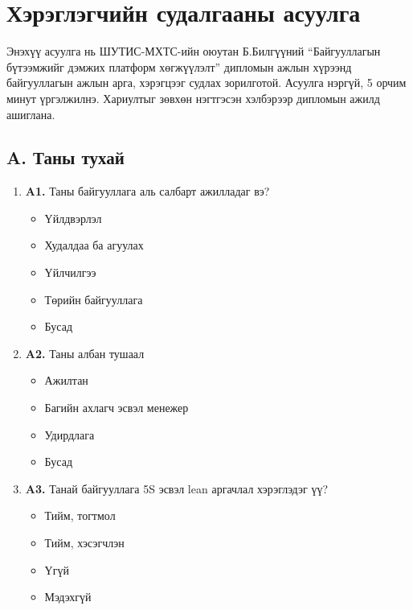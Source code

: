 
\chapter{Хэрэглэгчийн судалгааны асуулга}
\label{AppendixA}
Энэхүү асуулга нь ШУТИС-МХТС-ийн оюутан Б.Билгүүний ``Байгууллагын бүтээмжийг дэмжих платформ хөгжүүлэлт'' дипломын ажлын хүрээнд байгууллагын ажлын арга, хэрэгцээг судлах зорилготой. Асуулга нэргүй, 5 орчим минут үргэлжилнэ. Хариултыг зөвхөн нэгтгэсэн хэлбэрээр дипломын ажилд ашиглана.

\section*{A. Таны тухай}
\begin{enumerate}[label={}, leftmargin=0pt]
\item \textbf{A1.} Таны байгууллага аль салбарт ажилладаг вэ?
\begin{itemize}[label=$\square$]
  \item Үйлдвэрлэл
  \item Худалдаа ба агуулах
  \item Үйлчилгээ
  \item Төрийн байгууллага
  \item Бусад
\end{itemize}
\item \textbf{A2.} Таны албан тушаал
\begin{itemize}[label=$\square$]
  \item Ажилтан
  \item Багийн ахлагч эсвэл менежер
  \item Удирдлага
  \item Бусад
\end{itemize}
\item \textbf{A3.} Танай байгууллага 5S эсвэл lean аргачлал хэрэглэдэг үү?
\begin{itemize}[label=$\square$]
  \item Тийм, тогтмол
  \item Тийм, хэсэгчлэн
  \item Үгүй
  \item Мэдэхгүй
\end{itemize}
\end{enumerate}

